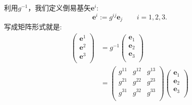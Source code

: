 \par 利用$g^{-1}$，我们定义倒易基矢$\boldsymbol{e}^i$:
\begin{equation}
    \boldsymbol{e}^{i} := g^{ij}\boldsymbol{e}_j\qquad i = 1,2,3.
\end{equation}
写成矩阵形式就是:
\begin{equation}
\begin{aligned}
        \left(
    \begin{array}{c}
         \boldsymbol{e}^1  \\
         \boldsymbol{e}^2  \\
         \boldsymbol{e}^3  \\
    \end{array}\right) &= g^{-1}  \left(
    \begin{array}{c}
         \boldsymbol{e}_1  \\
         \boldsymbol{e}_2  \\
         \boldsymbol{e}_3  \\
    \end{array}\right)\\
    & = \left( \begin{array}{ccc}
         g^{11} & g^{12} & g^{13}  \\
         g^{21} & g^{22} & g^{23}  \\
         g^{31} & g^{32} & g^{33}  \\
    \end{array}\right)\left(
    \begin{array}{c}
         \boldsymbol{e}_1  \\
         \boldsymbol{e}_2  \\
         \boldsymbol{e}_3  \\
    \end{array}\right)
\end{aligned}
\end{equation}

